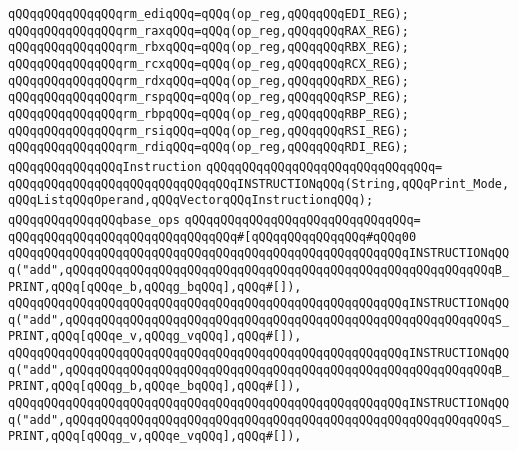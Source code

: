 \verb|qQQqqQQqqQQqqQQqrm_ediqQQq=qQQq(op_reg,qQQqqQQqEDI_REG);|\newline
\newline
\verb|qQQqqQQqqQQqqQQqrm_raxqQQq=qQQq(op_reg,qQQqqQQqRAX_REG);|\newline
\verb|qQQqqQQqqQQqqQQqrm_rbxqQQq=qQQq(op_reg,qQQqqQQqRBX_REG);|\newline
\verb|qQQqqQQqqQQqqQQqrm_rcxqQQq=qQQq(op_reg,qQQqqQQqRCX_REG);|\newline
\verb|qQQqqQQqqQQqqQQqrm_rdxqQQq=qQQq(op_reg,qQQqqQQqRDX_REG);|\newline
\verb|qQQqqQQqqQQqqQQqrm_rspqQQq=qQQq(op_reg,qQQqqQQqRSP_REG);|\newline
\verb|qQQqqQQqqQQqqQQqrm_rbpqQQq=qQQq(op_reg,qQQqqQQqRBP_REG);|\newline
\verb|qQQqqQQqqQQqqQQqrm_rsiqQQq=qQQq(op_reg,qQQqqQQqRSI_REG);|\newline
\verb|qQQqqQQqqQQqqQQqrm_rdiqQQq=qQQq(op_reg,qQQqqQQqRDI_REG);|\newline
\newline
\verb|qQQqqQQqqQQqqQQqInstruction|\newline
\verb|qQQqqQQqqQQqqQQqqQQqqQQqqQQqqQQq=|\newline
\verb|qQQqqQQqqQQqqQQqqQQqqQQqqQQqqQQqINSTRUCTIONqQQq(String,qQQqPrint_Mode,qQQqListqQQqOperand,qQQqVectorqQQqInstructionqQQq);|\newline
\newline
\verb|qQQqqQQqqQQqqQQqbase_ops|\newline
\verb|qQQqqQQqqQQqqQQqqQQqqQQqqQQqqQQq=|\newline
\verb|qQQqqQQqqQQqqQQqqQQqqQQqqQQqqQQq#[qQQqqQQqqQQqqQQq#qQQq00|\newline
\verb|qQQqqQQqqQQqqQQqqQQqqQQqqQQqqQQqqQQqqQQqqQQqqQQqqQQqqQQqINSTRUCTIONqQQq("add",qQQqqQQqqQQqqQQqqQQqqQQqqQQqqQQqqQQqqQQqqQQqqQQqqQQqqQQqqQQqB_PRINT,qQQq[qQQqe_b,qQQqg_bqQQq],qQQq#[]),|\newline
\verb|qQQqqQQqqQQqqQQqqQQqqQQqqQQqqQQqqQQqqQQqqQQqqQQqqQQqqQQqINSTRUCTIONqQQq("add",qQQqqQQqqQQqqQQqqQQqqQQqqQQqqQQqqQQqqQQqqQQqqQQqqQQqqQQqqQQqS_PRINT,qQQq[qQQqe_v,qQQqg_vqQQq],qQQq#[]),|\newline
\verb|qQQqqQQqqQQqqQQqqQQqqQQqqQQqqQQqqQQqqQQqqQQqqQQqqQQqqQQqINSTRUCTIONqQQq("add",qQQqqQQqqQQqqQQqqQQqqQQqqQQqqQQqqQQqqQQqqQQqqQQqqQQqqQQqqQQqB_PRINT,qQQq[qQQqg_b,qQQqe_bqQQq],qQQq#[]),|\newline
\verb|qQQqqQQqqQQqqQQqqQQqqQQqqQQqqQQqqQQqqQQqqQQqqQQqqQQqqQQqINSTRUCTIONqQQq("add",qQQqqQQqqQQqqQQqqQQqqQQqqQQqqQQqqQQqqQQqqQQqqQQqqQQqqQQqqQQqS_PRINT,qQQq[qQQqg_v,qQQqe_vqQQq],qQQq#[]),|\newline
